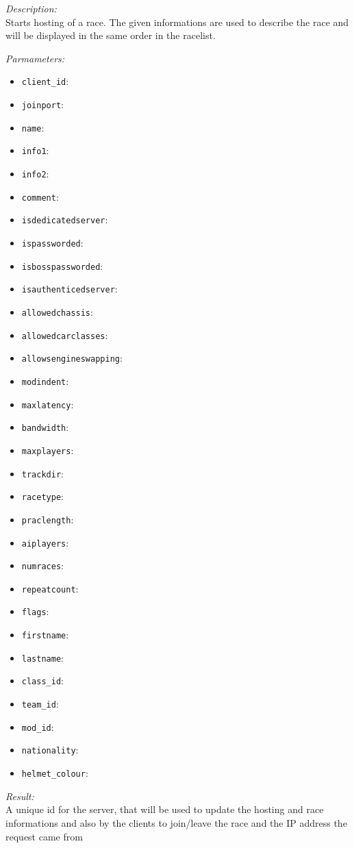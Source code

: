 \begin{description}
\item {\it Description:}\\
Starts hosting of a race. The given informations are used to describe the race and will be displayed in the same order in the racelist.
\item {\it Parmameters:}
\begin{itemize}
\item {\tt client\_id}: 
\item {\tt joinport}: 
\item {\tt name}: 
\item {\tt info1}: 
\item {\tt info2}: 
\item {\tt comment}: 
\item {\tt isdedicatedserver}: 
\item {\tt ispassworded}: 
\item {\tt isbosspassworded}: 
\item {\tt isauthenticedserver}: 
\item {\tt allowedchassis}: 
\item {\tt allowedcarclasses}: 
\item {\tt allowsengineswapping}: 
\item {\tt modindent}: 
\item {\tt maxlatency}: 
\item {\tt bandwidth}: 
\item {\tt maxplayers}: 
\item {\tt trackdir}: 
\item {\tt racetype}: 
\item {\tt praclength}: 
\item {\tt aiplayers}: 
\item {\tt numraces}: 
\item {\tt repeatcount}: 
\item {\tt flags}: 
\item {\tt firstname}: 
\item {\tt lastname}: 
\item {\tt class\_id}: 
\item {\tt team\_id}: 
\item {\tt mod\_id}: 
\item {\tt nationality}: 
\item {\tt helmet\_colour}: 
\end{itemize}
\item {\it Result:}\\
A unique id for the server, that will be used to update the hosting and race informations and also by the clients to join/leave the race and the IP address the request came from
\end{description}

